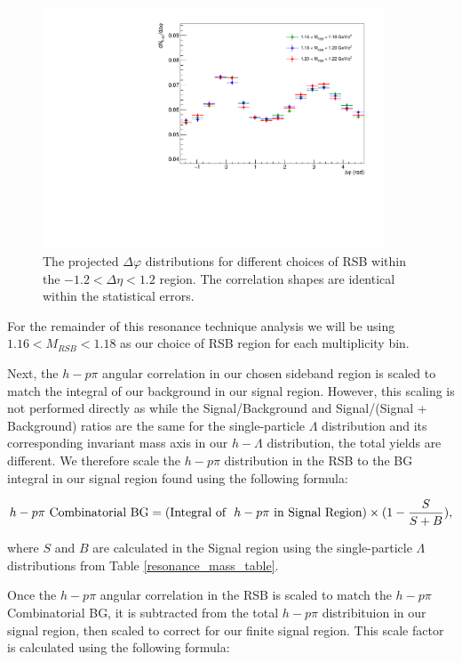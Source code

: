 \documentclass[ALICE,manyauthors]{ALICE_analysis_notes}
\begin{document}
\begin{figure}[ht]
\centering
\includegraphics[width=4in]{figures/h_lambda_dphi_rsbcomp_0_20.pdf}
\caption{The projected $\Delta\varphi$ distributions for different choices of RSB within the $-1.2 < \Delta\eta < 1.2$ region. The correlation shapes are identical within the statistical errors.}
\label{normRSBcomp}
\end{figure}

For the remainder of this resonance technique analysis we will be using $1.16 < M_{RSB} < 1.18$ as our choice of RSB region for each multiplicity bin. 

Next, the $h-p\pi$ angular correlation in our chosen sideband region is scaled to match the integral of our background in our signal region. However, this scaling is not performed directly as while the Signal/Background and Signal/(Signal + Background) ratios are the same for the single-particle $\Lambda$ distribution and its corresponding invariant mass axis in our $h-\Lambda$ distribution, the total yields are different. We therefore scale the $h-p\pi$ distribution in the RSB to the BG integral in our signal region found using the following formula:

\begin{align}
	h-p\pi \text{\space Combinatorial BG} = (\text{Integral of \space} h-p\pi \text{\space in Signal Region}) \times (1 - \frac{S}{S+B}),
\end{align}

where $S$ and $B$ are calculated in the Signal region using the single-particle $\Lambda$ distributions from Table \ref{resonance_mass_table}.

Once the $h-p\pi$ angular correlation in the RSB is scaled to match the $h-p\pi$ Combinatorial BG, it is subtracted from the total $h-p\pi$ distribituion in our signal region, then scaled to correct for our finite signal region. This scale factor is calculated using the following formula:
\end{document}
